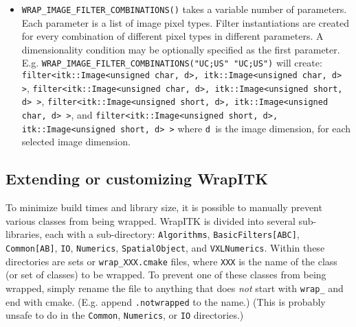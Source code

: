 \documentclass{InsightArticle}
\begin{document}
\begin{itemize}
  \item \verb$WRAP_IMAGE_FILTER_COMBINATIONS()$ takes a variable number of
parameters. Each parameter is a list of image pixel types. Filter instantiations
are created for every combination of different pixel types in different
parameters. A dimensionality condition may be optionally specified as the first
parameter. E.g. \verb$WRAP_IMAGE_FILTER_COMBINATIONS("UC;US" "UC;US")$ will
create: \verb$filter<itk::Image<unsigned char, d>, itk::Image<unsigned char, d> >$,
\verb$filter<itk::Image<unsigned char, d>, itk::Image<unsigned short, d> >$,
\verb$filter<itk::Image<unsigned short, d>, itk::Image<unsigned char, d> >$, and
\verb$filter<itk::Image<unsigned short, d>, itk::Image<unsigned short, d> >$
where \verb$d $is the image dimension, for each selected image dimension.


\end{itemize}


  \subsection{Extending or customizing WrapITK}

To minimize build times and library size, it is possible to manually prevent
various classes from being wrapped. WrapITK is divided into several
sub-libraries, each with a sub-directory: \verb$Algorithms$, \verb$BasicFilters[ABC]$,
\verb$Common[AB]$, \verb$IO$, \verb$Numerics$, \verb$SpatialObject$, and \verb$VXLNumerics$. Within these
directories are sets or \verb$wrap_XXX.cmake$ files, where \verb$XXX$ is the name of the class
(or set of classes) to be wrapped. To prevent one of these classes from being
wrapped, simply rename the file to anything that does {\em not} start with \verb$wrap_$ and
end with cmake. (E.g. append \verb$.notwrapped$ to the name.) (This is probably
unsafe to do in the \verb$Common$, \verb$Numerics$, or \verb$IO$ directories.)
\end{document}
